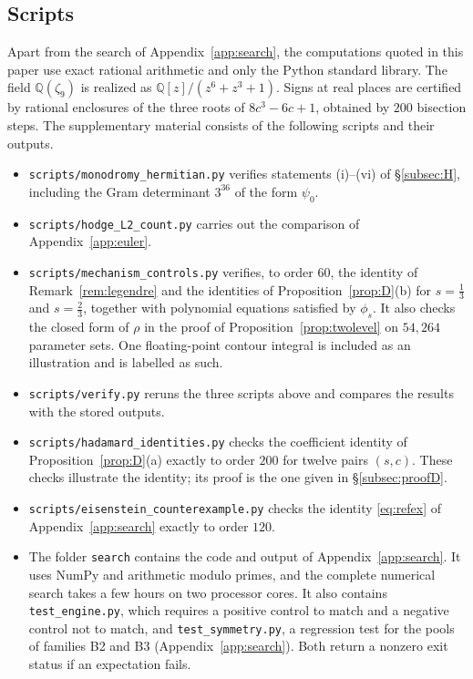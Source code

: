 \documentclass[11pt]{amsart}
\theoremstyle{definition}
\theoremstyle{remark}
\numberwithin{equation}{section}
\newcommand{\Q}{\mathbb{Q}}
\begin{document}
\subsection*{Scripts}
Apart from the search of Appendix~\ref{app:search}, the computations quoted in this paper use exact rational arithmetic and only the Python standard library. The field $\Q(\zeta_9)$ is realized as $\Q[z]/(z^6+z^3+1)$. Signs at real places are certified by rational enclosures of the three roots of $8c^3-6c+1$, obtained by $200$ bisection steps. The supplementary material consists of the following scripts and their outputs.
\begin{itemize}[leftmargin=2em]
\item \texttt{scripts/monodromy\_hermitian.py} verifies statements (i)--(vi) of \S\ref{subsec:H}, including the Gram determinant $3^{36}$ of the form $\psi_0$.
\item \texttt{scripts/hodge\_L2\_count.py} carries out the comparison of Appendix~\ref{app:euler}.
\item \texttt{scripts/mechanism\_controls.py} verifies, to order $60$, the identity of Remark~\ref{rem:legendre} and the identities of Proposition~\ref{prop:D}(b) for $s=\frac13$ and $s=\frac23$, together with polynomial equations satisfied by $\phi_s$. It also checks the closed form of $\rho$ in the proof of Proposition~\ref{prop:twolevel} on $54{,}264$ parameter sets. One floating-point contour integral is included as an illustration and is labelled as such.
\item \texttt{scripts/verify.py} reruns the three scripts above and compares the results with the stored outputs.
\item \texttt{scripts/hadamard\_identities.py} checks the coefficient identity of Proposition~\ref{prop:D}(a) exactly to order $200$ for twelve pairs $(s,c)$. These checks illustrate the identity; its proof is the one given in \S\ref{subsec:proofD}.
\item \texttt{scripts/eisenstein\_counterexample.py} checks the identity \eqref{eq:refex} of Appendix~\ref{app:search} exactly to order $120$.
\item The folder \texttt{search} contains the code and output of Appendix~\ref{app:search}. It uses NumPy and arithmetic modulo primes, and the complete numerical search takes a few hours on two processor cores. It also contains \texttt{test\_engine.py}, which requires a positive control to match and a negative control not to match, and \texttt{test\_symmetry.py}, a regression test for the pools of families B2 and B3 (Appendix~\ref{app:search}). Both return a nonzero exit status if an expectation fails.

\end{itemize}
\end{document}
